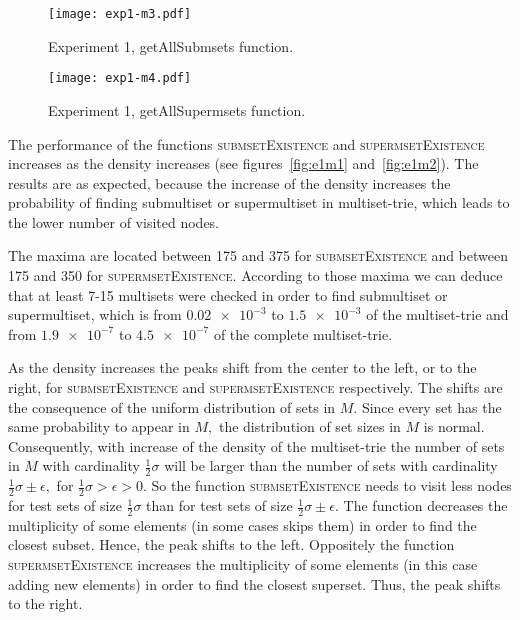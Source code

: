 \begin{figure}
\center
\texttt{[image: exp1-m3.pdf]}
\caption{Experiment 1, getAllSubmsets function.}
\label{fig:e1m3}
\end{figure}

\begin{figure}
\center
\texttt{[image: exp1-m4.pdf]}
\caption{Experiment 1, getAllSupermsets function.}
\label{fig:e1m4}
\end{figure}

The performance of the functions \textsc{submsetExistence} and 
\textsc{supermsetExistence} increases as the density increases (see figures~\ref{fig:e1m1}
and~\ref{fig:e1m2}). The results are as expected, because the increase of the 
density increases the probability of finding submultiset or supermultiset in 
multiset-trie, which leads to the lower number of visited nodes. 

The maxima are located between 175 and 375 for \textsc{submsetExistence} and 
between 175 and 350 for \textsc{supermsetExistence}. According to those maxima 
we can deduce that at least 7-15 multisets were checked in order to find 
submultiset or supermultiset, which is from $\num{0.02e-3}$ to $\num{1.5e-3}$ of the 
multiset-trie and from $\num{1.9e-7}$ to $\num{4.5e-7}$ of the complete 
multiset-trie.

As the density increases the peaks shift from the center to the left, or to the right, 
for \textsc{submsetExistence} and \textsc{supermsetExistence} respectively. 
The shifts are the consequence of the uniform distribution of sets in $M.$ 
Since every set has the same probability to appear in $M,$ the distribution of set 
sizes in $M$ is normal. Consequently, with increase of the density of the 
multiset-trie the number of sets in $M$ with cardinality $\frac{1}{2}\sigma$ will be 
larger than the number of sets with cardinality $\frac{1}{2}\sigma\pm\epsilon,$ 
for $\frac{1}{2}\sigma > \epsilon > 0.$ So the function \textsc{submsetExistence} 
needs to visit less nodes for test sets of size $\frac{1}{2}\sigma$ than for test 
sets of size $\frac{1}{2}\sigma\pm\epsilon.$ The function decreases the 
multiplicity of some elements (in some cases skips them) in order to find the 
closest subset. Hence, the peak shifts to the left. Oppositely the function 
\textsc{supermsetExistence} increases the multiplicity of some elements 
(in this case adding new elements) in order to find the closest superset. 
Thus, the peak shifts to the right.

